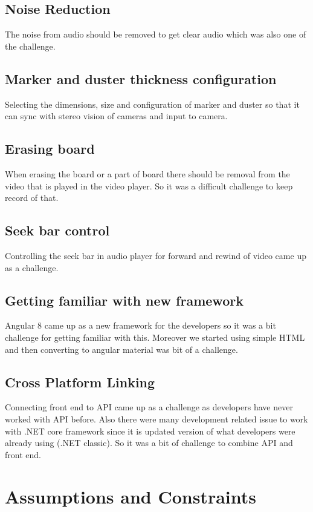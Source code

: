 \subsection{Noise Reduction}
The noise from audio should be removed to get clear audio which was also one of the challenge.
\bigskip

\subsection{Marker and duster thickness configuration}
Selecting the dimensions, size and configuration of marker and duster so that it can sync with stereo vision of cameras and input to camera.
\bigskip
\subsection{Erasing board}
When erasing the board or a part of board there should be removal from the video that is played in the video player. So it was a difficult challenge to keep record of that.
\bigskip
\subsection{Seek bar control}
Controlling the seek bar in audio player for forward and rewind of video came up as a challenge.
\bigskip
\subsection{Getting familiar with new framework}
Angular 8 came up as a new framework for the developers so it was a bit challenge for getting familiar with this. Moreover we started using simple HTML and then converting to angular material was bit of a challenge.
\bigskip

\subsection{Cross Platform Linking}
Connecting front end to API came up as a challenge as developers have never worked with API before. Also there were many development related issue to work with .NET core framework since it is updated version of what developers were already using (.NET classic). So it was a bit of challenge to combine API and front end.
\bigskip

\section{Assumptions and Constraints}

